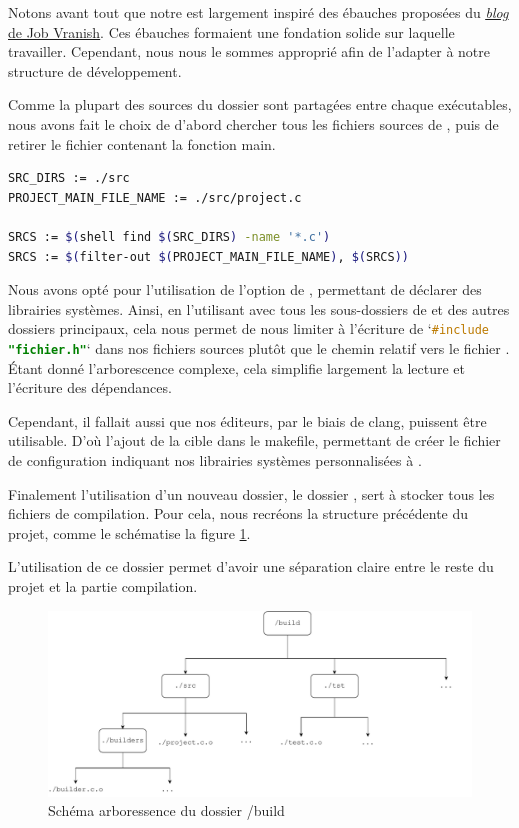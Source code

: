     Notons avant tout que notre  est largement inspiré des ébauches proposées du \underline {\href{https://spin.atomicobject.com/makefile-c-projects/}{ \textit{blog} de Job Vranish}}.
Ces ébauches formaient une fondation solide sur laquelle travailler. Cependant, nous nous le sommes approprié
afin de l'adapter à notre structure de développement.

    Comme la plupart des sources du dossier  sont partagées entre chaque exécutables, nous avons fait le choix de
d'abord chercher tous les fichiers sources de , puis de retirer le fichier  contenant la fonction main.

\begin{lstlisting}[frame=single, language=sh, caption={Filtrage des fichiers sources du jeu}]
SRC_DIRS := ./src
PROJECT_MAIN_FILE_NAME := ./src/project.c

SRCS := $(shell find $(SRC_DIRS) -name '*.c')
SRCS := $(filter-out $(PROJECT_MAIN_FILE_NAME), $(SRCS))
\end{lstlisting}

    Nous avons opté pour l'utilisation de l'option  de , permettant de déclarer des librairies systèmes. Ainsi, en 
l'utilisant avec tous les sous-dossiers de  et des autres dossiers principaux, cela nous permet de nous limiter à l'écriture de `\lstinline[language=C]{#include "fichier.h"}` dans nos fichiers sources plutôt que le chemin relatif vers le fichier . Étant donné  l'arborescence complexe, cela simplifie largement la lecture et l'écriture des dépendances.

    Cependant, il fallait aussi que nos éditeurs, par le biais de clang, puissent être utilisable. D'où l'ajout de la cible  dans
le makefile, permettant de créer le fichier de configuration  indiquant nos librairies systèmes personnalisées à .

Finalement l'utilisation d'un nouveau dossier, le dossier ,  sert à stocker tous les fichiers de compilation. Pour cela, nous recréons la structure précédente du projet, comme le schématise la figure \ref{fig:build_dir}. 

    L'utilisation de ce dossier permet d'avoir une séparation claire entre le reste du projet et la partie compilation.

\begin{center}
    \begin{figure}[H]
        \centering
        \includegraphics[width=.8\textwidth]{img/build_dir.pdf}
        \caption{Schéma arboressence du dossier /build}
        \label{fig:build_dir}
    \end{figure}
\end{center}



